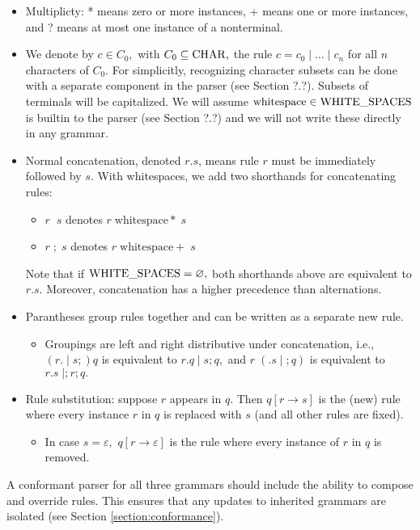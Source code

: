 \begin{itemize}
  \item Multiplicty: * means zero or more instances, + means one or more instances, and ? means at most one instance of a nonterminal.
  \item We denote by $c \in C_{0},$ with $C_{0} \subseteq \mathrm{CHAR},$ the rule $c = c_{0} \; | \; \dots \; | \; c_{n}$ for all $n$ characters of $C_{0}.$ For simplicitly, recognizing character subsets can be done with a separate component in the parser (see Section ?.?). Subsets of terminals will be capitalized. We will assume $\textrm{whitespace} \in \mathrm{WHITE\_SPACES}$ is builtin to the parser (see Section ?.?) and we will not write these directly in any grammar.
  \item Normal concatenation, denoted $r.s$, means rule $r$ must be immediately followed by $s.$ With whitespaces, we add two shorthands for concatenating rules:
  \begin{itemize}
    \item $r \; \; s$ denotes $r \; \textrm{whitespace}* \; s$
    \item $r \; ; \; s$ denotes $r \; \textrm{whitespace}+ \; s$
  \end{itemize}
  Note that if $\mathrm{WHITE\_SPACES} = \varnothing,$ both shorthands above are equivalent to $r.s.$ Moreover, concatenation has a higher precedence than alternations. %
  \item Parantheses group rules together and can be written as a separate new rule.
  \begin{itemize}
    \item Groupings are left and right distributive under concatenation, i.e., $(r. \; | \; s ;) q$ is equivalent to $r.q \;|\; s;q,$ and $r \; (.s \;|\; ;q)$ is equivalent to $r.s \;|; r;q.$
  \end{itemize}
  \item Rule substitution: suppose $r$ appears in $q.$ Then $q[r \to s]$ is the (new) rule where every instance $r$ in $q$ is replaced with $s$ (and all other rules are fixed). %
    \begin{itemize}
    \item In case $s = \varepsilon,$ $q[r \to \varepsilon]$ is the rule where every instance of $r$ in $q$ is removed.
    \end{itemize}
\end{itemize}

A conformant parser for all three grammars should include the ability to compose and override rules. This ensures that any updates to inherited grammars are isolated (see Section \ref{section:conformance}).

